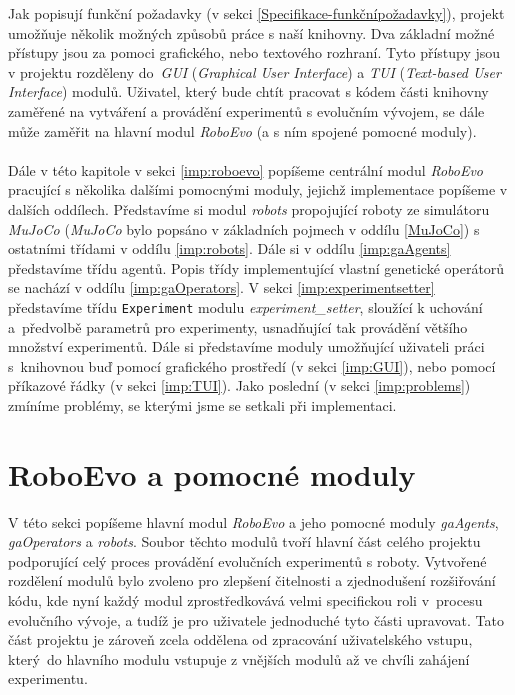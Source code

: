 Jak popisují funkční požadavky (v sekci \ref{Specifikace-funkčnípožadavky}),
projekt umožňuje několik možných způsobů práce s naší knihovny. Dva základní
možné přístupy jsou za pomoci grafického, nebo textového rozhraní. Tyto
přístupy jsou v projektu rozděleny do~\emph{GUI} (\emph{Graphical User
Interface}) a \emph{TUI} (\emph{Text-based User Interface}) modulů. Uživatel,
který bude chtít pracovat s kódem části knihovny zaměřené na vytváření a
provádění experimentů s evolučním vývojem, se dále může zaměřit na hlavní modul
\emph{RoboEvo} (a s ním spojené pomocné moduly).

\paragraph{} 
Dále v této kapitole v sekci \ref{imp:roboevo} popíšeme centrální modul
\emph{RoboEvo} pracující s několika dalšími pomocnými moduly, jejichž
implementace popíšeme v dalších oddílech. Představíme si modul \emph{robots}
propojující roboty ze simulátoru \emph{MuJoCo} (\emph{MuJoCo} bylo popsáno v
základních pojmech v oddílu \ref{MuJoCo}) s ostatními třídami v oddílu
\ref{imp:robots}. Dále si v oddílu \ref{imp:gaAgents} představíme třídu agentů.
Popis třídy implementující vlastní genetické operátorů se nachází v oddílu
\ref{imp:gaOperators}. V sekci \ref{imp:experimentsetter} představíme třídu
\texttt{Experiment} modulu \emph{experiment\_setter}, sloužící k uchování
a~předvolbě parametrů pro experimenty, usnadňující tak provádění většího
množství experimentů. Dále si představíme moduly umožňující uživateli
práci s~knihovnou buď pomocí grafického prostředí (v sekci \ref{imp:GUI}), nebo
pomocí příkazové řádky (v sekci \ref{imp:TUI}). Jako poslední (v sekci
\ref{imp:problems}) zmíníme problémy, se kterými jsme se setkali při
implementaci.

\section{RoboEvo a pomocné moduly}
V této sekci popíšeme hlavní modul \emph{RoboEvo} a jeho pomocné moduly
\emph{gaAgents}, \emph{gaOperators} a \emph{robots}. Soubor těchto modulů tvoří
hlavní část celého projektu podporující celý proces provádění evolučních
experimentů s roboty. Vytvořené rozdělení modulů bylo zvoleno pro zlepšení
čitelnosti a zjednodušení rozšiřování kódu, kde nyní každý modul
zprostředkovává velmi specifickou roli v~procesu evolučního vývoje, a tudíž je
pro uživatele jednoduché tyto části upravovat. Tato část projektu je zároveň
zcela oddělena od zpracování uživatelského vstupu, který~do hlavního modulu
vstupuje z vnějších modulů až ve chvíli zahájení experimentu. 

